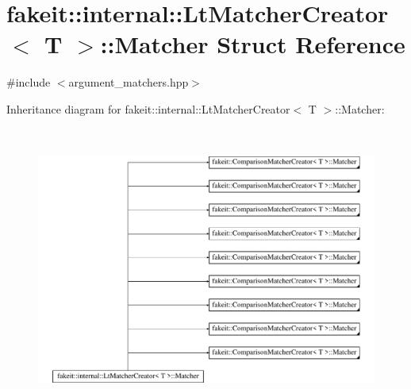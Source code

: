 \hypertarget{structfakeit_1_1internal_1_1LtMatcherCreator_1_1Matcher}{}\section{fakeit\+::internal\+::Lt\+Matcher\+Creator$<$ T $>$\+::Matcher Struct Reference}
\label{structfakeit_1_1internal_1_1LtMatcherCreator_1_1Matcher}


{\ttfamily \#include $<$argument\+\_\+matchers.\+hpp$>$}

Inheritance diagram for fakeit\+::internal\+::Lt\+Matcher\+Creator$<$ T $>$\+::Matcher\+:\begin{figure}[H]
\begin{center}
\leavevmode
\includegraphics[height=9.427609cm]{structfakeit_1_1internal_1_1LtMatcherCreator_1_1Matcher}
\end{center}
\end{figure}
